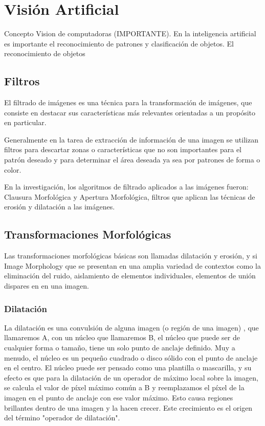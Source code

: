\section{Visión Artificial} \label{sect:Vision_Artificial}

Concepto Vision de computadoras (IMPORTANTE). En la inteligencia artificial es importante el reconocimiento de patrones y clasificación de objetos. El reconocimiento de objetos 
\subsection{Filtros }
El filtrado de imágenes es una técnica para la transformación de imágenes, que consiste en destacar  sus características más relevantes orientadas a un propósito en particular. 

Generalmente en la tarea de extracción de información de una imagen se utilizan filtros para descartar zonas o características que no son importantes para el patrón deseado y para determinar el área deseada ya sea por patrones de forma o color.

En la investigación, los algoritmos de filtrado aplicados a las imágenes fueron: Clausura Morfológica y Apertura Morfológica, filtros que aplican las técnicas de erosión y dilatación a las imágenes.

\subsection{Transformaciones Morfológicas}
Las transformaciones morfológicas básicas son llamadas dilatación y erosión, y si Image Morphology que se presentan en una amplia variedad de contextos como la eliminación del ruido, aislamiento de elementos individuales, elementos de unión dispares en en una imagen.

\subsubsection{Dilatación}
La dilatación es una convulsión de alguna imagen (o región de una imagen) , que llamaremos A, con un núcleo que llamaremos B, el núcleo que puede ser de cualquier forma o tamaño, tiene un solo punto de anclaje definido. Muy  a menudo, el núcleo es un pequeño cuadrado o disco sólido con el punto de anclaje en el centro. El núcleo puede ser pensado como una plantilla  o mascarilla, y su efecto es que para la dilatación de un operador de máximo local sobre la imagen, se calcula el valor de píxel máximo común a B y reemplazamos el píxel de la imagen en el punto de anclaje con ese valor máximo. Esto causa regiones brillantes dentro de una imagen y la hacen crecer. Este crecimiento es el origen del término "operador de dilatación". 

